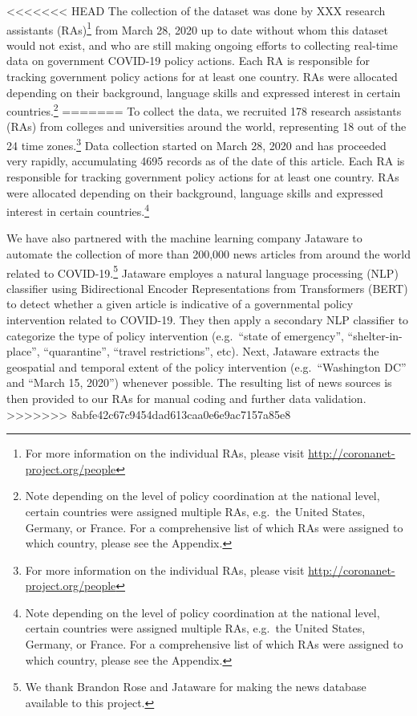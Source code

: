 \documentclass[]{article}
\let\rmarkdownfootnote\footnote%
\def\footnote{\protect\rmarkdownfootnote}
\begin{document}
<<<<<<< HEAD
The collection of the dataset was done by XXX research assistants (RAs)\footnote{For more information on the individual RAs, please visit \url{http://coronanet-project.org/people} } from March 28, 2020 up to date without whom this dataset would not exist, and who are still making ongoing efforts to collecting real-time data on government COVID-19 policy actions. Each RA is responsible for tracking government policy actions for at least one country. RAs were allocated depending on their background, language skills and expressed interest in certain countries.\footnote{Note depending on the level of policy coordination at the national level, certain countries were assigned multiple RAs, e.g.~the United States, Germany, or France. For a comprehensive list of which RAs were assigned to which country, please see the Appendix.}
=======
To collect the data, we recruited 178 research assistants (RAs) from colleges and universities around the world, representing 18 out of the 24 time zones.\footnote{For more information on the individual RAs, please visit \url{http://coronanet-project.org/people}} Data collection started on March 28, 2020 and has proceeded very rapidly, accumulating 4695 records as of the date of this article. Each RA is responsible for tracking government policy actions for at least one country. RAs were allocated depending on their background, language skills and expressed interest in certain countries.\footnote{Note depending on the level of policy coordination at the national level, certain countries were assigned multiple RAs, e.g.~the United States, Germany, or France. For a comprehensive list of which RAs were assigned to which country, please see the Appendix.}

We have also partnered with the machine learning company Jataware to automate the collection of more than 200,000 news articles from around the world related to COVID-19.\footnote{We thank Brandon Rose and Jataware for making the news database available to this project.} Jataware employes a natural language processing (NLP) classifier using Bidirectional Encoder Representations from Transformers (BERT) to detect whether a given article is indicative of a governmental policy intervention related to COVID-19. They then apply a secondary NLP classifier to categorize the type of policy intervention (e.g.~``state of emergency'', ``shelter-in-place'', ``quarantine'', ``travel restrictions'', etc). Next, Jataware extracts the geospatial and temporal extent of the policy intervention (e.g.~``Washington DC'' and ``March 15, 2020'') whenever possible. The resulting list of news sources is then provided to our RAs for manual coding and further data validation.
>>>>>>> 8abfe42c67c9454dad613caa0e6e9ac7157a85e8
\end{document}
